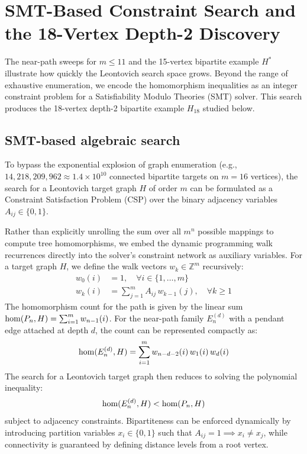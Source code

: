 \section{SMT-Based Constraint Search and the 18-Vertex Depth-2 Discovery}
\label{sec:discussion}

The near-path sweeps for $m \le 11$ and the 15-vertex bipartite example
$H^*$ illustrate how quickly the Leontovich search space grows. Beyond the
range of exhaustive enumeration, we encode the homomorphism inequalities as
an integer constraint problem for a Satisfiability Modulo Theories (SMT)
solver. This search produces the 18-vertex depth-2 bipartite example
$H_{18}$ studied below.

\subsection{SMT-based algebraic search}

To bypass the exponential explosion of graph enumeration (e.g.,
$14{,}218{,}209{,}962\approx1.4\times10^{10}$ connected bipartite targets on
$m=16$ vertices),
the search for a Leontovich target graph $H$ of order $m$ can be formulated as a Constraint Satisfaction Problem (CSP)
over the binary adjacency variables $A_{ij} \in \{0, 1\}$.

Rather than explicitly unrolling the sum over all $m^n$ possible mappings to compute tree homomorphisms,
we embed the dynamic programming walk recurrences directly into the solver's constraint network as auxiliary variables.
For a target graph $H$, we define the walk vectors $w_k \in \mathbb{Z}^m$ recursively:
\begin{align}
  w_0(i) &= 1, \quad \forall i \in \{1, \dots, m\} \\
  w_k(i) &= \sum_{j=1}^{m} A_{ij} \, w_{k-1}(j), \quad \forall k \ge 1
\end{align}
The homomorphism count for the path is given by the linear sum
$\mathrm{hom}(P_n, H) = \sum_{i=1}^{m} w_{n-1}(i)$. For the near-path family
$E_n^{(d)}$ with a pendant edge attached at depth $d$, the count can be
represented compactly as:
\begin{equation}
  \mathrm{hom}(E_n^{(d)}, H) = \sum_{i=1}^{m} w_{n-d-2}(i) \, w_1(i) \, w_d(i)
\end{equation}
The search for a Leontovich target graph then reduces to solving the polynomial inequality:
\begin{equation}
  \label{eq:smt_ineq}
  \mathrm{hom}(E_n^{(d)}, H) < \mathrm{hom}(P_n, H)
\end{equation}
subject to adjacency constraints. Bipartiteness can be enforced dynamically
by introducing partition variables $x_i \in \{0, 1\}$ such that $A_{ij} = 1
\implies x_i \neq x_j$, while connectivity is guaranteed by defining
distance levels from a root vertex.


